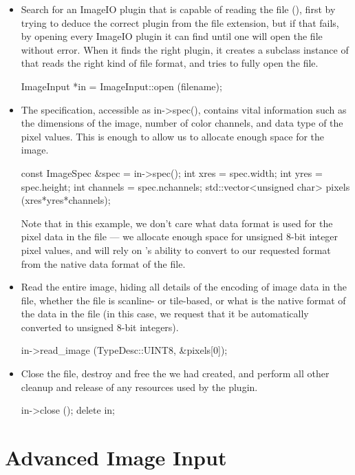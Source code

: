 \begin{itemize}
\item Search for an ImageIO plugin that is capable of reading the file
  (), first by trying to deduce the correct plugin from the
  file extension, but if that fails, by opening every ImageIO plugin it
  can find until one will open the file without error.  When it finds
  the right plugin, it creates a subclass instance of \ImageInput that
  reads the right kind of file format, and tries to fully open the file.
  \begin{code}
        ImageInput *in = ImageInput::open (filename);
  \end{code}
\item The specification, accessible as {\cf in->spec()}, contains 
  vital information such as the
  dimensions of the image, number of color channels, and data type of
  the pixel values.  This is enough to allow us to allocate enough space
  for the image.
  \begin{code}
        const ImageSpec &spec = in->spec();
        int xres = spec.width;
        int yres = spec.height;
        int channels = spec.nchannels;
        std::vector<unsigned char> pixels (xres*yres*channels);
  \end{code}
  Note that in this example, we don't care what data format is used for
  the pixel data in the file --- we allocate enough space for unsigned
  8-bit integer pixel values, and will rely on \product's ability to
  convert to our requested format from the native data format of the
  file.
\item Read the entire image, hiding all details of the encoding of image
  data in the file, whether the file is scanline- or tile-based, or what
  is the native format of the data in the file (in this case, we request
  that it be automatically converted to unsigned 8-bit integers).
  \begin{code}
        in->read_image (TypeDesc::UINT8, &pixels[0]);
  \end{code}
\item Close the file, destroy and free the \ImageInput we had created,
  and perform all other cleanup and release of any resources used by
  the plugin.
  \begin{code}
        in->close ();
        delete in;
  \end{code}
\end{itemize}



\section{Advanced Image Input}
\label{sec:advancedimageinput}

